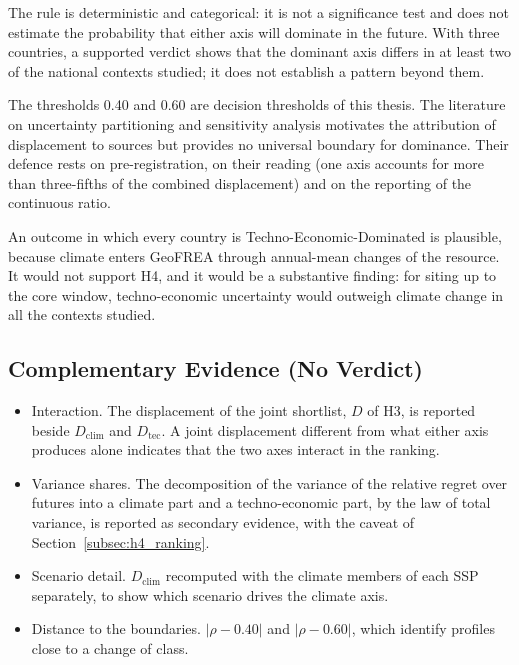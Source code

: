 The rule is deterministic and categorical: it is not a significance test and
does not estimate the probability that either axis will dominate in the future.
With three countries, a supported verdict shows that the dominant axis differs
in at least two of the national contexts studied; it does not establish a
pattern beyond them.

The thresholds 0.40 and 0.60 are decision thresholds of this thesis. The
literature on uncertainty partitioning and sensitivity analysis motivates the
attribution of displacement to sources but provides no universal boundary for
dominance. Their defence rests on pre-registration, on their reading (one axis
accounts for more than three-fifths of the combined displacement) and on the
reporting of the continuous ratio.

An outcome in which every country is Techno-Economic-Dominated is plausible,
because climate enters GeoFREA through annual-mean changes of the resource. It
would not support H4, and it would be a substantive finding: for siting up to
the core window, techno-economic uncertainty would outweigh climate change in
all the contexts studied.

\subsection{Complementary Evidence (No Verdict)}
\label{subsec:h4_complementary}

\begin{itemize}
    \item Interaction. The displacement of the joint shortlist, $D$ of H3, is
    reported beside $D_{\mathrm{clim}}$ and $D_{\mathrm{tec}}$. A joint
    displacement different from what either axis produces alone indicates that
    the two axes interact in the ranking.
    \item Variance shares. The decomposition of the variance of the relative
    regret over futures into a climate part and a techno-economic part, by the
    law of total variance, is reported as secondary evidence, with the caveat of
    Section~\ref{subsec:h4_ranking}.
    \item Scenario detail. $D_{\mathrm{clim}}$ recomputed with the climate members
    of each SSP separately, to show which scenario drives the climate axis.
    \item Distance to the boundaries. $|\rho-0.40|$ and $|\rho-0.60|$, which
    identify profiles close to a change of class.
\end{itemize}

